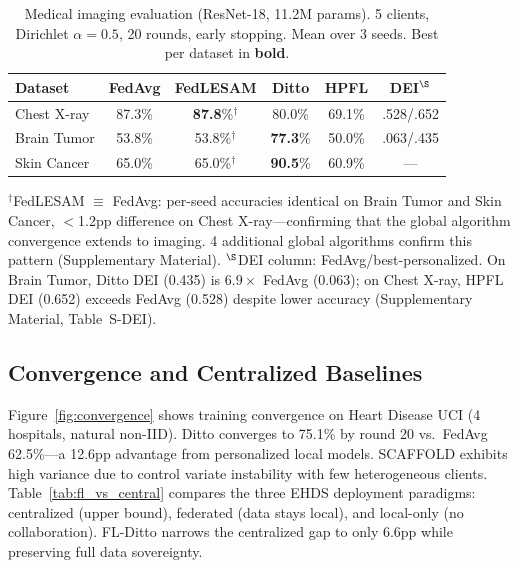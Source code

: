 \documentclass[conference,letterpaper]{IEEEtran}
\begin{document}
\begin{table}[htbp]
\centering
\caption{Medical imaging evaluation (ResNet-18, 11.2M params). 5 clients, Dirichlet $\alpha{=}0.5$, 20 rounds, early stopping. Mean over 3 seeds. Best per dataset in \textbf{bold}.}
\label{tab:imaging_main}
\small
\begin{tabular}{lccccc}
\toprule
\textbf{Dataset} & \textbf{FedAvg} & \textbf{FedLESAM} & \textbf{Ditto} & \textbf{HPFL} & \textbf{DEI$^\S$} \\
\midrule
Chest X-ray & 87.3\% & \textbf{87.8}\%$^\dagger$ & 80.0\% & 69.1\% & .528/.652 \\
Brain Tumor & 53.8\% & 53.8\%$^\dagger$ & \textbf{77.3}\% & 50.0\% & .063/.435 \\
Skin Cancer & 65.0\% & 65.0\%$^\dagger$ & \textbf{90.5}\% & 60.9\% & --- \\
\bottomrule
\end{tabular}

\vspace{1mm}
\footnotesize{$^\dagger$FedLESAM $\equiv$ FedAvg: per-seed accuracies identical on Brain Tumor and Skin Cancer, $<$1.2pp difference on Chest X-ray---confirming that the global algorithm convergence extends to imaging. 4 additional global algorithms confirm this pattern (Supplementary Material). $^\S$DEI column: FedAvg/best-personalized. On Brain Tumor, Ditto DEI (0.435) is $6.9\times$ FedAvg (0.063); on Chest X-ray, HPFL DEI (0.652) exceeds FedAvg (0.528) despite lower accuracy (Supplementary Material, Table~S-DEI).}
\end{table}

\subsection{Convergence and Centralized Baselines}

Figure~\ref{fig:convergence} shows training convergence on Heart Disease UCI (4 hospitals, natural non-IID). Ditto converges to 75.1\% by round 20 vs.\ FedAvg 62.5\%---a 12.6pp advantage from personalized local models. SCAFFOLD exhibits high variance due to control variate instability with few heterogeneous clients. Table~\ref{tab:fl_vs_central} compares the three EHDS deployment paradigms: centralized (upper bound), federated (data stays local), and local-only (no collaboration). FL-Ditto narrows the centralized gap to only 6.6pp while preserving full data sovereignty.
\end{document}
